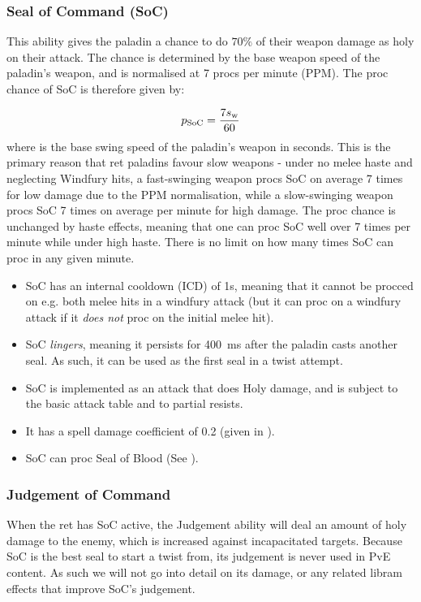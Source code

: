 \documentclass[letterpaper,11pt]{article}
\begin{document}
		
	\subsubsection{Seal of Command (SoC)}
	This ability gives the paladin a chance to do $70\%$ of their weapon damage as holy on their attack.
	The chance is determined by the base weapon speed of the paladin's weapon, and is normalised at 7 procs per minute (PPM).
	The proc chance of SoC is therefore given by:
	
	\begin{equation}
		p_\mathrm{SoC}   = \frac{7 s_\mathrm{w} }{60}
	\end{equation}
	where \ws is the base swing speed of the paladin's weapon in seconds.
	This is the primary reason that ret paladins favour slow weapons - under no melee haste and neglecting Windfury hits, a fast-swinging weapon procs SoC on average 7 times for low damage due to the PPM normalisation, while a slow-swinging weapon procs SoC 7 times on average per minute for high damage.
	The proc chance is unchanged by haste effects, meaning that one can proc SoC well over 7 times per minute while under high haste.
	There is no limit on how many times SoC can proc in any given minute.
	
	\begin{itemize}
		\item SoC has an internal cooldown (ICD) of 1s, meaning that it cannot be procced on e.g. both melee hits in a windfury attack (but it can proc on a windfury attack if it \emph{does not} proc on the initial melee hit).
		\item SoC \emph{lingers}, meaning it persists for 400~ms after the paladin casts another seal. As such, it can be used as the first seal in a twist attempt.
		\item SoC is implemented as an attack that does Holy damage, and is subject to the basic attack table and to partial resists.
		\item It has a spell damage coefficient of 0.2 (given in ).		
		\item SoC can proc Seal of Blood (See ).		
	\end{itemize}
	
	\subsubsection{Judgement of Command}
	When the ret has SoC active, the Judgement ability will deal an amount of holy damage to the enemy, which is increased against incapacitated targets.
	Because SoC is the best seal to start a twist from, its judgement is never used in PvE content.
	As such we will not go into detail on its damage, or any related libram effects that improve SoC's judgement.
	
\end{document}
